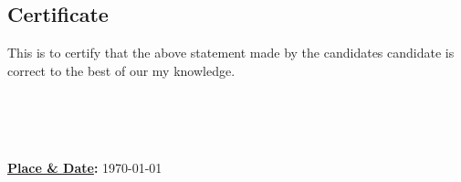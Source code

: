 \begin{minipage}{\textwidth}
    \begin{flushleft}
        {\let\clearpage\relax\chapter*{\centering \huge Certificate}}

        This is to certify that the above statement made by the \ifdefined\twoAuthor candidates \else candidate \fi is correct to the best of 
        \ifdefined\multipleadvisors our \else my \fi 
        knowledge.

        \vspace{0.4in}

        \begin{minipage}{0.45\textwidth}
            \begin{flushleft}
                
                \textbf{\advisorone}
                \textbf{
                    \ifx\advisortwo\empty\else      \\\advisortwo\fi 
                    \ifx\advisorthree\empty\else    \\\advisorthree\fi 
                    \ifx\advisorfour\empty\else     \\\advisorfour\fi   
                }
            \end{flushleft}
            
        \end{minipage}%
        \hfill
        \begin{minipage}{0.45\textwidth}
            \textbf{\underline{Place \& Date}:} \today
        \end{minipage}%
    \end{flushleft}
\end{minipage}